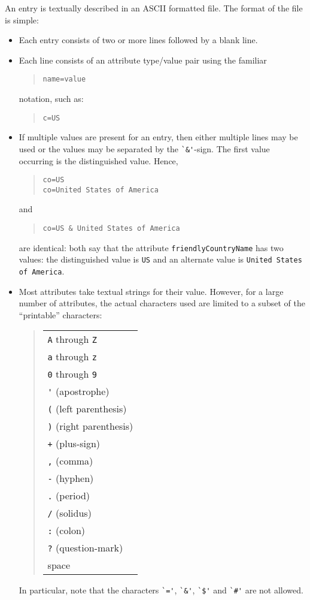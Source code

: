 An entry is textually described in an ASCII formatted file.
The format of the file is simple:
\begin{itemize}
\item	Each entry consists of two or more lines followed by a blank line.

\item	Each line consists of an attribute type/value pair using
	the familiar
\begin{quote}\small\begin{verbatim}
name=value
\end{verbatim}\end{quote}
notation,
such as:
\begin{quote}\small\begin{verbatim}
c=US
\end{verbatim}\end{quote}

\item	If multiple values are present for an entry,
	then either multiple lines may be used or the values may
	be separated by the \verb"`&'"-sign.
	The first value occurring is the distinguished value.
	Hence,
\begin{quote}\small\begin{verbatim}
co=US
co=United States of America
\end{verbatim}\end{quote}
and
\begin{quote}\small\begin{verbatim}
co=US & United States of America
\end{verbatim}\end{quote}
are identical:
both say that the attribute \verb"friendlyCountryName" has two values:
the distinguished value is \verb"US" and an alternate value is
\verb"United States of America".

\item	Most attributes take textual strings for their value.
	However, for a large number of attributes,
	the actual characters used are limited to a subset of the
	``printable'' characters: 
\begin{quote}\begin{tabular}{l}
\verb"A" through \verb"Z"\\
\verb"a" through \verb"z"\\
\verb"0" through \verb"9"\\
\verb"'" (apostrophe)\\
\verb"(" (left parenthesis)\\
\verb")" (right parenthesis)\\
\verb"+" (plus-sign)\\
\verb"," (comma)\\
\verb"-" (hyphen)\\
\verb"." (period)\\
\verb"/" (solidus)\\
\verb":" (colon)\\
\verb"?" (question-mark)\\
space
\end{tabular}\end{quote}
	In particular, note that the characters \verb"`='", \verb"`&'",
	\verb"`$'" and \verb"`#'" are not allowed.


\end{itemize}
